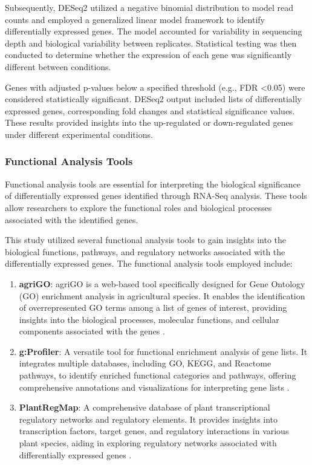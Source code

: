 \documentclass[12pt,letterpaper]{article}
\begin{document}
Subsequently, DESeq2 utilized a negative binomial distribution to model read counts and employed a generalized linear model framework to identify differentially expressed genes. The model accounted for variability in sequencing depth and biological variability between replicates. Statistical testing was then conducted to determine whether the expression of each gene was significantly different between conditions.

Genes with adjusted p-values below a specified threshold (e.g., FDR \textless 0.05) were considered statistically significant. DESeq2 output included lists of differentially expressed genes, corresponding fold changes and statistical significance values. These results provided insights into the up-regulated or down-regulated genes under different experimental conditions.


\subsubsection{Functional Analysis Tools}

Functional analysis tools are essential for interpreting the biological significance of differentially expressed genes identified through RNA-Seq analysis. These tools allow researchers to explore the functional roles and biological processes associated with the identified genes.

This study utilized several functional analysis tools to gain insights into the biological functions, pathways, and regulatory networks associated with the differentially expressed genes. The functional analysis tools employed include:

\begin{enumerate}
\item \textbf{agriGO}: agriGO is a web-based tool specifically designed for Gene Ontology (GO) enrichment analysis in agricultural species. It enables the identification of overrepresented GO terms among a list of genes of interest, providing insights into the biological processes, molecular functions, and cellular components associated with the genes \parencite{tian2017agrigo}.

\item \textbf{g:Profiler}: A versatile tool for functional enrichment analysis of gene lists. It integrates multiple databases, including GO, KEGG, and Reactome pathways, to identify enriched functional categories and pathways, offering comprehensive annotations and visualizations for interpreting gene lists \parencite{reimand2007gProfiler}.

\item \textbf{PlantRegMap}: A comprehensive database of plant transcriptional regulatory networks and regulatory elements. It provides insights into transcription factors, target genes, and regulatory interactions in various plant species, aiding in exploring regulatory networks associated with differentially expressed genes \parencite{tian2020plantregmap}.
\end{enumerate}
\end{document}
